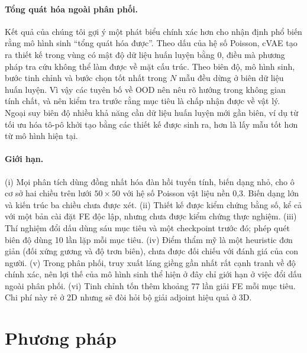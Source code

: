 \documentclass[a4paper,11pt]{article}
\begin{document}
\paragraph{Tổng quát hóa ngoài phân phối.}
Kết quả của chúng tôi gợi ý một phát biểu chính xác hơn cho nhận định phổ
biến rằng mô hình sinh ``tổng quát hóa được''. Theo dấu của hệ số Poisson,
cVAE tạo ra thiết kế trong vùng có mật độ dữ liệu huấn luyện bằng 0, điều mà
phương pháp tra cứu không thể làm được về mặt cấu trúc. Theo biên độ, mô
hình sinh, bước tinh chỉnh và bước chọn tốt nhất trong $N$ mẫu đều dừng ở
biên dữ liệu huấn luyện. Vì vậy các tuyên bố về OOD nên nêu rõ hướng trong
không gian tính chất, và nên kiểm tra trước rằng mục tiêu là chấp nhận được
về vật lý. Ngoại suy biên độ nhiều khả năng cần dữ liệu huấn luyện mới gần
biên, ví dụ từ tối ưu hóa tô-pô khởi tạo bằng các thiết kế được sinh ra,
hơn là lấy mẫu tốt hơn từ mô hình hiện tại.

\paragraph{Giới hạn.}
(i) Mọi phân tích dùng đồng nhất hóa đàn hồi tuyến tính, biến dạng nhỏ, cho
ô cơ sở hai chiều trên lưới $50\times50$ với hệ số Poisson vật liệu nền 0,3.
Biến dạng lớn và kiến trúc ba chiều chưa được xét.
(ii) Thiết kế được kiểm chứng bằng số, kể cả với một bản cài đặt FE độc lập,
nhưng chưa được kiểm chứng thực nghiệm.
(iii) Thí nghiệm đổi dấu dùng sáu mục tiêu và một checkpoint trước đó; phép
quét biên độ dùng 10 lần lặp mỗi mục tiêu.
(iv) Điểm thẩm mỹ là một heuristic đơn giản (đối xứng gương và độ trơn biên),
chưa được đối chiếu với đánh giá của con người.
(v) Trong phân phối, truy xuất láng giềng gần nhất rất cạnh tranh về độ
chính xác, nên lợi thế của mô hình sinh thể hiện ở đây chỉ giới hạn ở việc
đổi dấu ngoài phân phối.
(vi) Tinh chỉnh tốn thêm khoảng 77 lần giải FE mỗi mục tiêu. Chi phí này rẻ
ở 2D nhưng sẽ đòi hỏi bộ giải adjoint hiệu quả ở 3D.

\section{Phương pháp}
\end{document}
